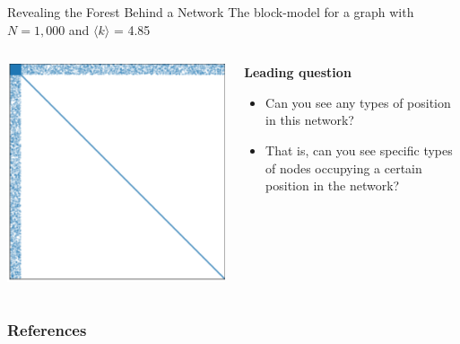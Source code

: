 \documentclass[notes, aspectratio=1610]{beamer}
\begin{document}
\begin{frame}{Revealing the Forest Behind a Network}
	{The block-model for a graph with $N = 1,000$ and $\langle k \rangle$ = 4.85 }
	\begin{columns}
		\begin{column}{0.5\textwidth}
			\centering
			\includegraphics[height=.8\textheight]{images/heatmap}
		\end{column}
		\begin{column}{0.5\textwidth}
			\textbf{Leading question}

			\begin{itemize}
				\item 
				Can you see any types of position in this network?
				\item That is, can you see specific types of nodes 
				occupying a certain position in the network?
			\end{itemize}
		\end{column}
	\end{columns}
\end{frame}

\begin{frame}
	\frametitle{References}
	\printbibliography
 \end{frame} 

\end{document}
